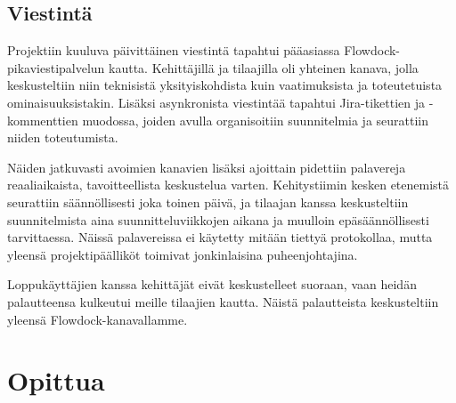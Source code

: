 \documentclass{article}
\begin{document}
\subsection{Viestintä}

Projektiin kuuluva päivittäinen viestintä tapahtui pääasiassa
Flowdock-pikaviestipalvelun kautta. Kehittäjillä ja tilaajilla oli yhteinen
kanava, jolla keskusteltiin niin teknisistä yksityiskohdista kuin vaatimuksista
ja toteutetuista ominaisuuksistakin. Lisäksi asynkronista viestintää tapahtui
Jira-tikettien ja -kommenttien muodossa, joiden avulla organisoitiin
suunnitelmia ja seurattiin niiden toteutumista.

Näiden jatkuvasti avoimien kanavien lisäksi ajoittain pidettiin palavereja
reaaliaikaista, tavoitteellista keskustelua varten. Kehitystiimin kesken
etenemistä seurattiin säännöllisesti joka toinen päivä, ja tilaajan kanssa
keskusteltiin suunnitelmista aina suunnitteluviikkojen aikana ja muulloin
epäsäännöllisesti tarvittaessa. Näissä palavereissa ei käytetty mitään tiettyä
protokollaa, mutta yleensä projektipäälliköt toimivat jonkinlaisina
puheenjohtajina.

Loppukäyttäjien kanssa kehittäjät eivät keskustelleet suoraan, vaan heidän
palautteensa kulkeutui meille tilaajien kautta. Näistä palautteista
keskusteltiin yleensä Flowdock-kanavallamme.

\section{Opittua}
\end{document}
